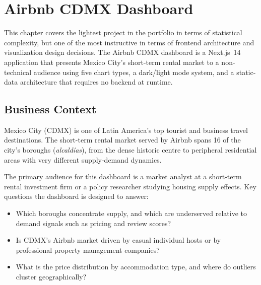 
\chapter{Airbnb CDMX Dashboard}
\label{ch:airbnb}


This chapter covers the lightest project in the portfolio in terms of statistical
complexity, but one of the most instructive in terms of frontend architecture and
visualization design decisions. The Airbnb CDMX dashboard is a Next.js~14
application that presents Mexico City's short-term rental market to a non-technical
audience using five chart types, a dark/light mode system, and a static-data
architecture that requires no backend at runtime.

\section{Business Context}
\label{sec:airbnb-business}

Mexico City (CDMX) is one of Latin America's top tourist and business travel
destinations. The short-term rental market served by Airbnb spans 16 of the city's
boroughs (\textit{alcaldías}), from the dense historic centre to peripheral
residential areas with very different supply-demand dynamics.

The primary audience for this dashboard is a market analyst at a short-term rental
investment firm or a policy researcher studying housing supply effects. Key questions
the dashboard is designed to answer:

\begin{itemize}
  \item Which boroughs concentrate supply, and which are underserved relative to
        demand signals such as pricing and review scores?
  \item Is CDMX's Airbnb market driven by casual individual hosts or by professional
        property management companies?
  \item What is the price distribution by accommodation type, and where do outliers
        cluster geographically?
\end{itemize}

